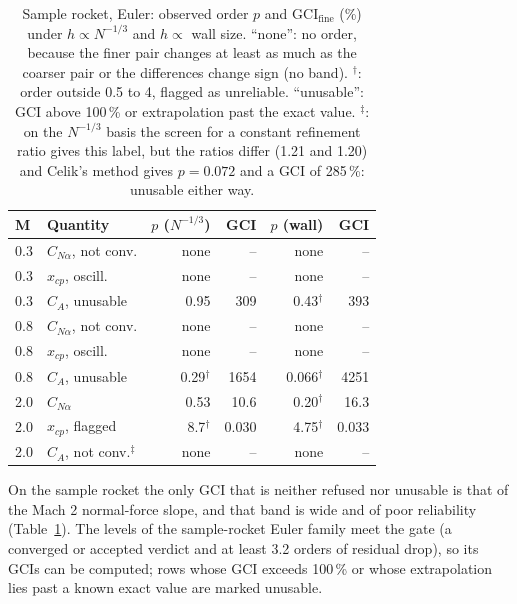 \documentclass[twocolumn]{labreport}
\newcommand{\CNa}{C_{N\alpha}}
\newcommand{\fine}{\mathrm{fine}}
\begin{document}
\begin{table}[t]
\centering
\caption{Sample rocket, Euler: observed order $p$ and $\mathrm{GCI}_\fine$ (\%) under $h\propto N^{-1/3}$ and $h\propto$ wall size.
``none'': no order, because the finer pair changes at least as much as the coarser pair or the differences change sign (no band).
$^\dagger$: order outside 0.5 to 4, flagged as unreliable. ``unusable'': GCI above 100\,\% or extrapolation past the exact value.
$^\ddagger$: on the $N^{-1/3}$ basis the screen for a constant refinement ratio gives this label, but the ratios differ (1.21 and 1.20) and Celik's method gives $p=0.072$ and a GCI of 285\,\%: unusable either way.}
\label{tab:sample}
\small
\setlength{\tabcolsep}{2.4pt}
\begin{tabular}{@{}llrrrr@{}}
\toprule
M & Quantity & $p$ ($N^{-1/3}$) & GCI & $p$ (wall) & GCI \\
\midrule
0.3 & $\CNa$, not conv. & none & -- & none & -- \\
0.3 & $x_{cp}$, oscill. & none & -- & none & -- \\
0.3 & $C_A$, unusable & 0.95 & 309 & 0.43$^\dagger$ & 393 \\
0.8 & $\CNa$, not conv. & none & -- & none & -- \\
0.8 & $x_{cp}$, oscill. & none & -- & none & -- \\
0.8 & $C_A$, unusable & 0.29$^\dagger$ & 1654 & 0.066$^\dagger$ & 4251 \\
2.0 & $\CNa$ & 0.53 & 10.6 & 0.20$^\dagger$ & 16.3 \\
2.0 & $x_{cp}$, flagged & 8.7$^\dagger$ & 0.030 & 4.75$^\dagger$ & 0.033 \\
2.0 & $C_A$, not conv.$^\ddagger$ & none & -- & none & -- \\
\bottomrule
\end{tabular}
\end{table}

On the sample rocket the only GCI that is neither refused nor unusable is that of the Mach 2 normal-force slope, and that band is wide and of poor reliability (Table~\ref{tab:sample}).
The levels of the sample-rocket Euler family meet the gate (a converged or accepted verdict and at least 3.2 orders of residual drop), so its GCIs can be computed; rows whose GCI exceeds 100\,\% or whose extrapolation lies past a known exact value are marked unusable.
\end{document}
